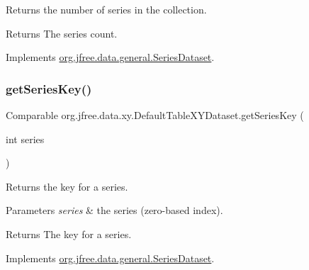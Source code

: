 Returns the number of series in the collection.

\begin{DoxyReturn}{Returns}
The series count. 
\end{DoxyReturn}


Implements \mbox{\hyperlink{interfaceorg_1_1jfree_1_1data_1_1general_1_1_series_dataset_a84fe822f5918f941d9de1ed1b73c9f58}{org.\+jfree.\+data.\+general.\+Series\+Dataset}}.

\mbox{\label{classorg_1_1jfree_1_1data_1_1xy_1_1_default_table_x_y_dataset_a9490a0483fb491f814d37ed04c96d02b}} 
\subsubsection{\texorpdfstring{get\+Series\+Key()}{getSeriesKey()}}
{\footnotesize\ttfamily Comparable org.\+jfree.\+data.\+xy.\+Default\+Table\+X\+Y\+Dataset.\+get\+Series\+Key (\begin{DoxyParamCaption}\item[{int}]{series }\end{DoxyParamCaption})}

Returns the key for a series.


\begin{DoxyParams}{Parameters}
{\em series} & the series (zero-\/based index).\\
\hline
\end{DoxyParams}
\begin{DoxyReturn}{Returns}
The key for a series. 
\end{DoxyReturn}


Implements \mbox{\hyperlink{interfaceorg_1_1jfree_1_1data_1_1general_1_1_series_dataset_a60488892b2314a05a012999e26a74178}{org.\+jfree.\+data.\+general.\+Series\+Dataset}}.

\mbox{\label{classorg_1_1jfree_1_1data_1_1xy_1_1_default_table_x_y_dataset_a19b5ac6d388445218c7f0a2cdf2a29af}} 
